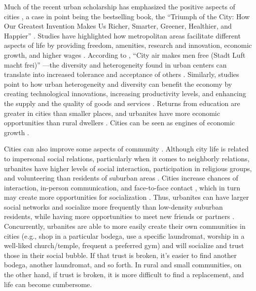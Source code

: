 \documentclass[11pt, letterpaper]{article}
\begin{document}
\begin{spacing}{1.4}
Much of the recent urban scholarship has emphasized the positive aspects of cities \citep{thrift05,amin06,aokCityBook15,peck16}, a case in point being the bestselling book, the ``Triumph of the City: How Our Greatest Invention Makes Us Richer, Smarter, Greener, Healthier,
and Happier'' \citep{glaeser11}.
Studies have highlighted how metropolitan areas facilitate different aspects of
life by providing freedom, amenities, research and innovation, economic growth,
and higher wages \citep{tonnies57,osullivan09,meyer13,rosenthal02,bettencourt10,stansel2019,ahlfeldt2022,liu2020,smith2021}.
According to \cite{park84}, ``City air makes men free (Stadt Luft macht frei)''
\citep[p.12]{park84}---the diversity and heterogeneity found in urban centers
can translate into increased tolerance and acceptance of others
\citep{tuch87,wirth38,stephan82,aok20}. Similarly, studies point to how urban
heterogeneity and diversity can benefit the economy by creating technological
innovations, increasing productivity levels, and enhancing the supply and the
quality of goods and services
\citep{rodriguez2019does,rodriguez2020,mulligan2020}. Returns from education are
greater in cities than smaller places, and urbanites have more economic
opportunities than rural dwellers
\citep{florida13,berry2005,storper2009,roca2017}. Cities can be seen as engines of economic growth  \citep{osullivan09,carvalho2016,glaeser11}.  %

Cities can also improve some aspects of community \citep[]{chavis2002sense,macke2019smart}. 
 Although city life is related to impersonal social relations, particularly when
 it comes to neighborly relations, urbanites  have higher levels of social
 interaction, participation in religious groups, and volunteering than residents
 of suburban areas \citep{nguyen10,mazumdar18,anon17-cities-oslo}. Cities
 increase chances of interaction, in-person communication, and face-to-face
 contact \citep{carvalho2016,storper2004}, which in turn may create more
 opportunities for socialization \citep{anon17-cities-oslo}. Thus, urbanites can have larger social networks and socialize more frequently than low-density suburban residents, while having more opportunities to meet new friends or partners \citep{mouratidis18,anon17-cities-oslo}.   
 Concurrently, urbanites are able to more easily create their own communities in
 cities (e.g., shop in a particular bodega, use a specific laundromat, worship
 in a well-liked church/temple, frequent a preferred gym) and will socialize and
 trust those in their social bubble. If that trust is broken, it's easier to
 find another bodega, another laundromat, and so forth. {In rural and small
   communities, on the other hand, if trust is broken, it is more difficult to
   find a replacement, and life can become cumbersome.}
 

\end{spacing}
\end{document}
